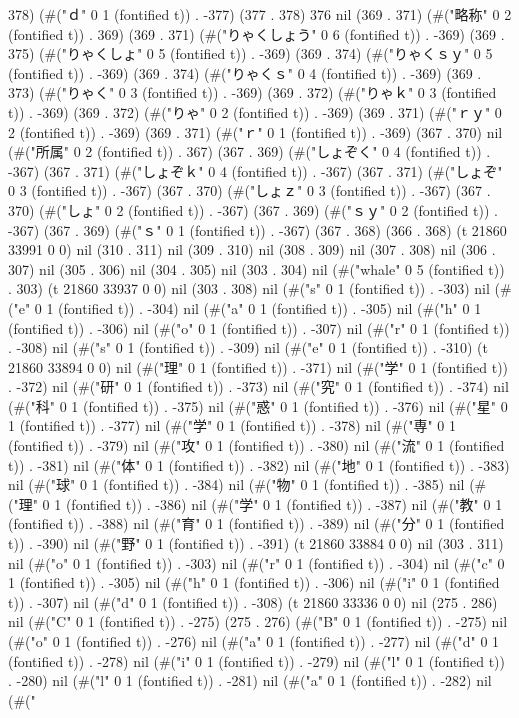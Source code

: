 378) (#("ｄ" 0 1 (fontified t)) . -377) (377 . 378) 376 nil (369 . 371) (#("略称" 0 2 (fontified t)) . 369) (369 . 371) (#("りゃくしょう" 0 6 (fontified t)) . -369) (369 . 375) (#("りゃくしょ" 0 5 (fontified t)) . -369) (369 . 374) (#("りゃくｓｙ" 0 5 (fontified t)) . -369) (369 . 374) (#("りゃくｓ" 0 4 (fontified t)) . -369) (369 . 373) (#("りゃく" 0 3 (fontified t)) . -369) (369 . 372) (#("りゃｋ" 0 3 (fontified t)) . -369) (369 . 372) (#("りゃ" 0 2 (fontified t)) . -369) (369 . 371) (#("ｒｙ" 0 2 (fontified t)) . -369) (369 . 371) (#("ｒ" 0 1 (fontified t)) . -369) (367 . 370) nil (#("所属" 0 2 (fontified t)) . 367) (367 . 369) (#("しょぞく" 0 4 (fontified t)) . -367) (367 . 371) (#("しょぞｋ" 0 4 (fontified t)) . -367) (367 . 371) (#("しょぞ" 0 3 (fontified t)) . -367) (367 . 370) (#("しょｚ" 0 3 (fontified t)) . -367) (367 . 370) (#("しょ" 0 2 (fontified t)) . -367) (367 . 369) (#("ｓｙ" 0 2 (fontified t)) . -367) (367 . 369) (#("ｓ" 0 1 (fontified t)) . -367) (367 . 368) (366 . 368) (t 21860 33991 0 0) nil (310 . 311) nil (309 . 310) nil (308 . 309) nil (307 . 308) nil (306 . 307) nil (305 . 306) nil (304 . 305) nil (303 . 304) nil (#("whale" 0 5 (fontified t)) . 303) (t 21860 33937 0 0) nil (303 . 308) nil (#("s" 0 1 (fontified t)) . -303) nil (#("e" 0 1 (fontified t)) . -304) nil (#("a" 0 1 (fontified t)) . -305) nil (#("h" 0 1 (fontified t)) . -306) nil (#("o" 0 1 (fontified t)) . -307) nil (#("r" 0 1 (fontified t)) . -308) nil (#("s" 0 1 (fontified t)) . -309) nil (#("e" 0 1 (fontified t)) . -310) (t 21860 33894 0 0) nil (#("理" 0 1 (fontified t)) . -371) nil (#("学" 0 1 (fontified t)) . -372) nil (#("研" 0 1 (fontified t)) . -373) nil (#("究" 0 1 (fontified t)) . -374) nil (#("科" 0 1 (fontified t)) . -375) nil (#("惑" 0 1 (fontified t)) . -376) nil (#("星" 0 1 (fontified t)) . -377) nil (#("学" 0 1 (fontified t)) . -378) nil (#("専" 0 1 (fontified t)) . -379) nil (#("攻" 0 1 (fontified t)) . -380) nil (#("流" 0 1 (fontified t)) . -381) nil (#("体" 0 1 (fontified t)) . -382) nil (#("地" 0 1 (fontified t)) . -383) nil (#("球" 0 1 (fontified t)) . -384) nil (#("物" 0 1 (fontified t)) . -385) nil (#("理" 0 1 (fontified t)) . -386) nil (#("学" 0 1 (fontified t)) . -387) nil (#("教" 0 1 (fontified t)) . -388) nil (#("育" 0 1 (fontified t)) . -389) nil (#("分" 0 1 (fontified t)) . -390) nil (#("野" 0 1 (fontified t)) . -391) (t 21860 33884 0 0) nil (303 . 311) nil (#("o" 0 1 (fontified t)) . -303) nil (#("r" 0 1 (fontified t)) . -304) nil (#("c" 0 1 (fontified t)) . -305) nil (#("h" 0 1 (fontified t)) . -306) nil (#("i" 0 1 (fontified t)) . -307) nil (#("d" 0 1 (fontified t)) . -308) (t 21860 33336 0 0) nil (275 . 286) nil (#("C" 0 1 (fontified t)) . -275) (275 . 276) (#("B" 0 1 (fontified t)) . -275) nil (#("o" 0 1 (fontified t)) . -276) nil (#("a" 0 1 (fontified t)) . -277) nil (#("d" 0 1 (fontified t)) . -278) nil (#("i" 0 1 (fontified t)) . -279) nil (#("l" 0 1 (fontified t)) . -280) nil (#("l" 0 1 (fontified t)) . -281) nil (#("a" 0 1 (fontified t)) . -282) nil (#("%